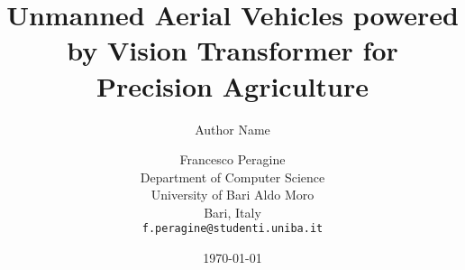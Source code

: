 \documentclass[10pt,twocolumn,letterpaper]{article}
\title{Unmanned Aerial Vehicles powered by Vision Transformer for Precision Agriculture}
\author{Author Name}
\date{\today}
\begin{document}

\author{Francesco Peragine\\
Department of Computer Science\\
University of Bari Aldo Moro\\
Bari, Italy\\
{\tt\small f.peragine@studenti.uniba.it}}

\maketitle

    







{
    \small
    
    
}
\end{document}
